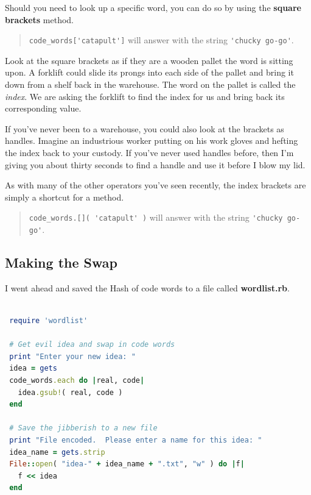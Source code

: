 \documentclass[10pt,twoside]{report}
\begin{document}
Should you need to look up a specific word, you can do so by using the
{\bf square brackets} method.

\begin{quote}
\lstinline[breaklines=true]|code_words['catapult']| will answer with
the string \lstinline[breaklines=true]|'chucky go-go'|.\end{quote}


Look at the square brackets as if they are a wooden pallet the word is
sitting upon. A forklift could slide its prongs into each side of the
pallet and bring it down from a shelf back in the warehouse.  The word
on the pallet is called the {\em index}. We are asking the forklift to
find the index for us and bring back its corresponding value.

If you've never been to a warehouse, you could also look at the
brackets as handles. Imagine an industrious worker putting on his work
gloves and hefting the index back to your custody.  If you've never
used handles before, then I'm giving you about thirty seconds to find
a handle and use it before I blow my lid.

As with many of the other operators you've seen recently, the index
brackets are simply a shortcut for a method.

\begin{quote}
\lstinline[breaklines=true]|code_words.[]( 'catapult' )| will answer
with the string \lstinline[breaklines=true]|'chucky go-go'|.\end{quote}




\subsection{Making the Swap}



I went ahead and saved the Hash of code words to a file called {\bf
  wordlist.rb}.


\begin{lstlisting}[basicstyle=\ttfamily\color{basiccolor},
    commentstyle = \ttfamily\color{commentcolor},
    keywordstyle=\ttfamily\color{keywordscolor},
    stringstyle=\color{stringcolor},
    language=Ruby,
    basicstyle=\small\ttfamily,
    showstringspaces=false,
  ]

 require 'wordlist'

 # Get evil idea and swap in code words
 print "Enter your new idea: "
 idea = gets
 code_words.each do |real, code|
   idea.gsub!( real, code )
 end

 # Save the jibberish to a new file
 print "File encoded.  Please enter a name for this idea: "
 idea_name = gets.strip
 File::open( "idea-" + idea_name + ".txt", "w" ) do |f|
   f << idea
 end

\end{lstlisting}
\end{document}
